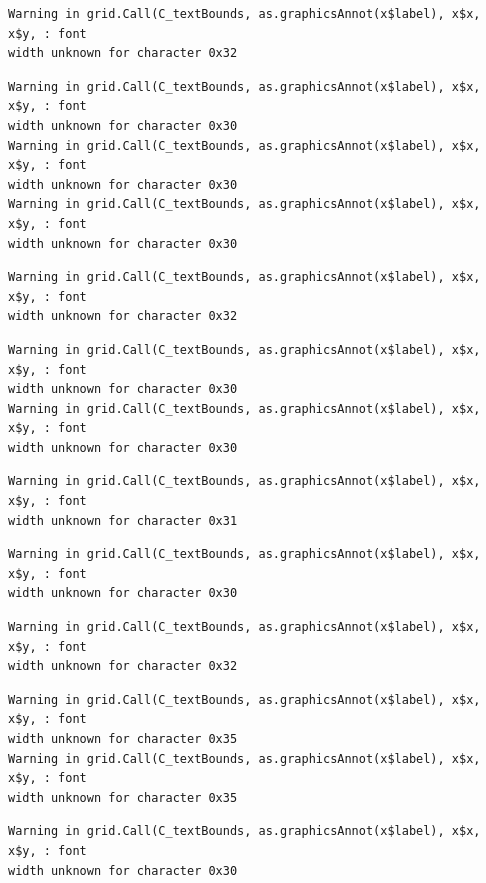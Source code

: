 \documentclass[
  letterpaper,
]{scrbook}
\begin{document}
\begin{verbatim}
Warning in grid.Call(C_textBounds, as.graphicsAnnot(x$label), x$x, x$y, : font
width unknown for character 0x32
\end{verbatim}

\begin{verbatim}
Warning in grid.Call(C_textBounds, as.graphicsAnnot(x$label), x$x, x$y, : font
width unknown for character 0x30
Warning in grid.Call(C_textBounds, as.graphicsAnnot(x$label), x$x, x$y, : font
width unknown for character 0x30
Warning in grid.Call(C_textBounds, as.graphicsAnnot(x$label), x$x, x$y, : font
width unknown for character 0x30
\end{verbatim}

\begin{verbatim}
Warning in grid.Call(C_textBounds, as.graphicsAnnot(x$label), x$x, x$y, : font
width unknown for character 0x32
\end{verbatim}

\begin{verbatim}
Warning in grid.Call(C_textBounds, as.graphicsAnnot(x$label), x$x, x$y, : font
width unknown for character 0x30
Warning in grid.Call(C_textBounds, as.graphicsAnnot(x$label), x$x, x$y, : font
width unknown for character 0x30
\end{verbatim}

\begin{verbatim}
Warning in grid.Call(C_textBounds, as.graphicsAnnot(x$label), x$x, x$y, : font
width unknown for character 0x31
\end{verbatim}

\begin{verbatim}
Warning in grid.Call(C_textBounds, as.graphicsAnnot(x$label), x$x, x$y, : font
width unknown for character 0x30
\end{verbatim}

\begin{verbatim}
Warning in grid.Call(C_textBounds, as.graphicsAnnot(x$label), x$x, x$y, : font
width unknown for character 0x32
\end{verbatim}

\begin{verbatim}
Warning in grid.Call(C_textBounds, as.graphicsAnnot(x$label), x$x, x$y, : font
width unknown for character 0x35
Warning in grid.Call(C_textBounds, as.graphicsAnnot(x$label), x$x, x$y, : font
width unknown for character 0x35
\end{verbatim}

\begin{verbatim}
Warning in grid.Call(C_textBounds, as.graphicsAnnot(x$label), x$x, x$y, : font
width unknown for character 0x30
\end{verbatim}
\end{document}
